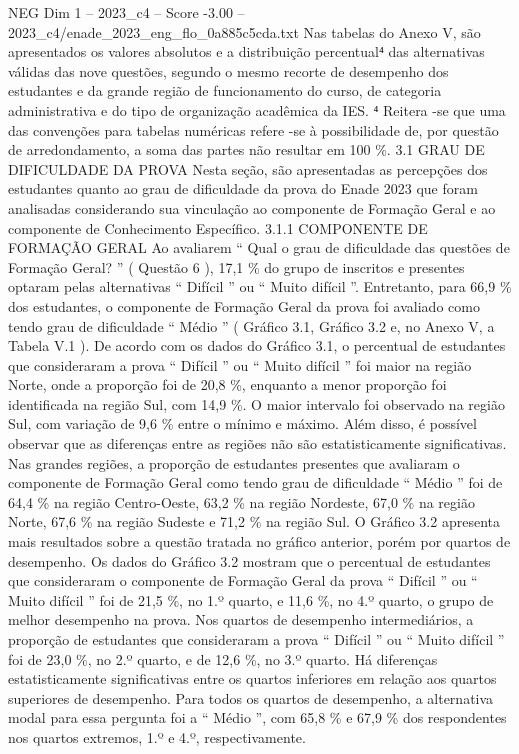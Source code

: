 \begin{textsample}{NEG Dim 1 – 2023\_c4 – Score -3.00 – 2023\_c4/enade\_2023\_eng\_flo\_0a885c5cda.txt}
Nas tabelas do Anexo V, são apresentados os valores absolutos e a distribuição percentual⁴ das alternativas válidas das nove questões, segundo o mesmo recorte de desempenho dos estudantes e da grande região de funcionamento do curso, de categoria administrativa e do tipo de organização acadêmica da IES. ⁴ Reitera -se que uma das convenções para tabelas numéricas refere -se à possibilidade de, por questão de arredondamento, a soma das partes não resultar em 100 \%. 3.1 GRAU DE DIFICULDADE DA PROVA Nesta seção, são apresentadas as percepções dos estudantes quanto ao grau de dificuldade da prova do Enade 2023 que foram analisadas considerando sua vinculação ao componente de Formação Geral e ao componente de Conhecimento Específico. 3.1.1 COMPONENTE DE FORMAÇÃO GERAL Ao avaliarem “ Qual o grau de dificuldade das questões de Formação Geral? ” ( Questão 6 ), 17,1 \% do grupo de inscritos e presentes optaram pelas alternativas “ Difícil ” ou “ Muito difícil ”.
Entretanto, para 66,9 \% dos estudantes, o componente de Formação Geral da prova foi avaliado como tendo grau de dificuldade “ Médio ” ( Gráfico 3.1, Gráfico 3.2 e, no Anexo V, a Tabela V.1 ).
De acordo com os dados do Gráfico 3.1, o percentual de estudantes que consideraram a prova “ Difícil ” ou “ Muito difícil ” foi maior na região Norte, onde a proporção foi de 20,8 \%, enquanto a menor proporção foi identificada na região Sul, com 14,9 \%.
O maior intervalo foi observado na região Sul, com variação de 9,6 \% entre o mínimo e máximo.
Além disso, é possível observar que as diferenças entre as regiões não são estatisticamente significativas.
Nas grandes regiões, a proporção de estudantes presentes que avaliaram o componente de Formação Geral como tendo grau de dificuldade “ Médio ” foi de 64,4 \% na região Centro-Oeste, 63,2 \% na região Nordeste, 67,0 \% na região Norte, 67,6 \% na região Sudeste e 71,2 \% na região Sul.
O Gráfico 3.2 apresenta mais resultados sobre a questão tratada no gráfico anterior, porém por quartos de desempenho.
Os dados do Gráfico 3.2 mostram que o percentual de estudantes que consideraram o componente de Formação Geral da prova “ Difícil ” ou “ Muito difícil ” foi de 21,5 \%, no 1.º quarto, e 11,6 \%, no 4.º quarto, o grupo de melhor desempenho na prova.
Nos quartos de desempenho intermediários, a proporção de estudantes que consideraram a prova “ Difícil ” ou “ Muito difícil ” foi de 23,0 \%, no 2.º quarto, e de 12,6 \%, no 3.º quarto.
Há diferenças estatisticamente significativas entre os quartos inferiores em relação aos quartos superiores de desempenho.
Para todos os quartos de desempenho, a alternativa modal para essa pergunta foi a “ Médio ”, com 65,8 \% e 67,9 \% dos respondentes nos quartos extremos, 1.º e 4.º, respectivamente.

\end{textsample}
